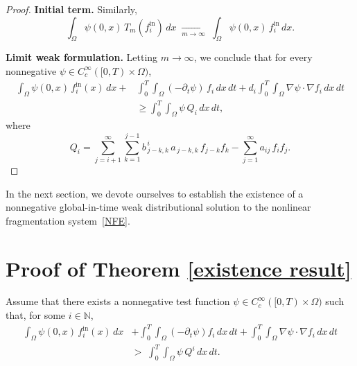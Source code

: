 \documentclass[a4paper,12pt,reqno]{amsart}
\theoremstyle{plain}
\numberwithin{equation}{section}
\begin{document}
\begin{proof}
		\medskip
		
		\noindent\textbf{Initial term.}
		Similarly,
		\[
		\int_\Omega \psi(0,x)\,T_m(f_i^{\mathrm{in}})\,dx
		\;\xrightarrow[m\to\infty]{}\;
		\int_\Omega \psi(0,x)\,f_i^{\mathrm{in}}\,dx.
		\]
		
		\medskip
		
		\noindent\textbf{Limit weak formulation.}
		Letting $m\to\infty$, we conclude that for every nonnegative
		$\psi \in C_c^\infty([0,T)\times\Omega)$,
		\begin{align*}
			\int_\Omega \psi(0,x)\,f_i^{\mathrm{in}}(x)\,dx
			+&
			\int_0^T\!\!\int_\Omega
			(-\partial_t\psi)\,f_i \,dx\,dt
			+
			d_i \int_0^T\!\!\int_\Omega
			\nabla\psi \cdot \nabla f_i \,dx\,dt
			\\
			&\ge
			\int_0^T\!\!\int_\Omega
			\psi\,Q_i \,dx\,dt,
		\end{align*}
		where
		\[
		Q_i
		=
		\sum_{j=i+1}^{\infty}\sum_{k=1}^{j-1}
		b^{\,i}_{\,j-k,k}\,a_{\,j-k,k}\,f_{j-k}f_k
		-
		\sum_{j=1}^{\infty} a_{i j}\,f_i f_j.
		\]
	\end{proof}
	In the next section, we devote ourselves to establish the existence of a
	nonnegative global-in-time weak distributional solution to the nonlinear
	fragmentation system~\eqref{NFE}.
	
	
	\section{Proof of Theorem \ref{existence result}}\label{final_section}
	
	Assume that there exists a nonnegative test function
	\(
	\psi \in C_c^\infty([0,T)\times \Omega)
	\)
	such that, for some $i\in\mathbb{N}$,
	\begin{align}
		\int_\Omega \psi(0,x)\, f_i^{\mathrm{in}}(x)\,dx
		&+
		\int_0^T \int_\Omega
		\left(-\partial_t \psi\right) f_i
		\,dx\,dt
		+
		\int_0^T \int_\Omega
		\nabla \psi \cdot \nabla f_i
		\,dx\,dt
		\nonumber\\
		&>\;
		\int_0^T \int_\Omega
		\psi\, Q^i
		\,dx\,dt .
		\label{ineq:strict}
	\end{align}
	
\end{document}
